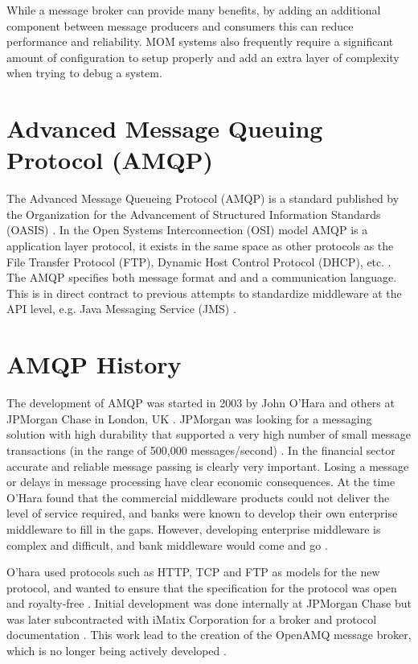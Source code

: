 \documentclass{thesis}
\begin{document}
While a message broker can provide many benefits, by adding an additional component between message producers and consumers this can reduce performance and reliability.  MOM systems also frequently require a significant amount of configuration to setup properly and add an extra layer of complexity when trying to debug a system.
 

\section{Advanced Message Queuing Protocol (AMQP)}
The Advanced Message Queueing Protocol (AMQP) is a standard published by the Organization for the Advancement of Structured Information Standards (OASIS) \cite{OASIS}.  In the Open Systems Interconnection (OSI) model AMQP is a application layer protocol, it exists in the same space as other protocols as the File Transfer Protocol (FTP), Dynamic Host Control Protocol (DHCP), etc.  \cite{o2007toward}.  The AMQP specifies both message format and and a communication language.  This is in direct contract to previous attempts to standardize middleware at the API level, e.g. Java Messaging Service (JMS) \cite{ORACLE_JMS}.

\section{AMQP History}
The development of AMQP was started in 2003 by John O'Hara and others at JPMorgan Chase in London, UK \cite{o2007toward}.  JPMorgan was looking for a messaging solution with high durability that supported a very high number of small message transactions (in the range of 500,000 messages/second) \cite{kramer2009advanced}.  In the financial sector accurate and reliable message passing is clearly very important.  Losing a message or delays in message processing have clear economic consequences.  At the time O'Hara found that the commercial middleware products could not deliver the level of service required,  and banks were known to develop their own enterprise middleware to fill in the gaps. However, developing enterprise middleware is complex and difficult, and bank middleware would come and go \cite{kramer2009advanced}.

O'hara used protocols such as HTTP, TCP and FTP as models for the new protocol, and wanted to ensure that the specification for the protocol was open and royalty-free \cite{o2007toward}.  Initial development was done internally at JPMorgan Chase but was later subcontracted with iMatix Corporation for a broker and protocol documentation \cite{Cameron}.  This work lead to the creation of the OpenAMQ message broker, which is no longer being actively developed \cite{openamq-eol}. 
\end{document}

